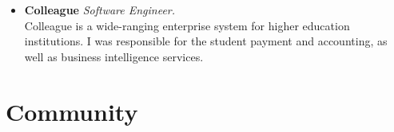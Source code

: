 \documentclass{article}
\begin{document}
\begin{list}{}{
    \setlength{\leftmargin}{0cm}	%
    \setlength{\parsep}{0.15cm}
}
    \begin{itemize}

        \item \textbf{Colleague} \emph{Software Engineer.}\\
            Colleague is a wide-ranging enterprise system for higher education
            institutions. I was responsible for the student payment and
            accounting, as well as business intelligence services.


    \end{itemize}

\end{list}

\section{Community}
\end{document}
